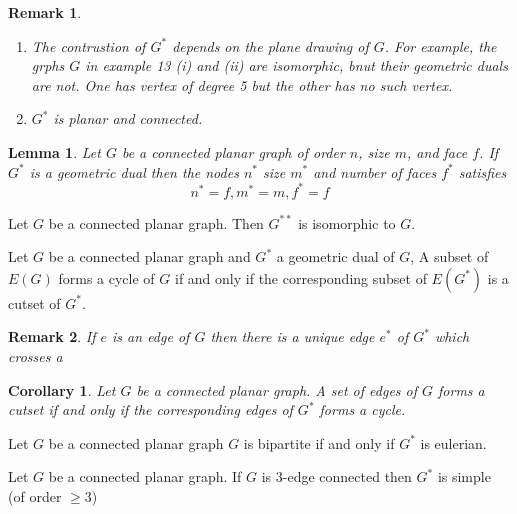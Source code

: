 \documentclass[12pt]{article}
\newenvironment{theorem}[1]{%
  \renewcommand\themanualtheoreminner{#1}%
  \manualtheoreminner
}{\endmanualtheoreminner}
\newtheorem*{corollary}{Corollary}
\newtheorem*{lemma}{Lemma}
\newtheorem*{remark}{Remark}
\begin{document}
\begin{remark}
	\begin{enumerate}
		\item The contrustion of $G^{*}$ depends on the plane drawing of $G$. For example, the grphs $G$ in example 13 (i) and (ii) are isomorphic, bnut their geometric duals are not.  One has vertex of degree 5 but the other has no such vertex.
		\item $G^{*}$ is planar and connected.
	\end{enumerate}
\end{remark}


\begin{lemma}
	Let $G$ be a connected planar graph of order $n$, size $m$, and face $f$. If $G^{*}$ is a geometric dual then the nodes $n^{*}$ size $m^{*}$ and number of faces $f^{*}$ satisfies
	\[n^{*} = f, m^{*} = m, f^{*} =f\]
\end{lemma}


\begin{theorem}{10}
	Let $G$ be a connected planar graph. Then $G^{**}$ is isomorphic to $G$.
\end{theorem}

\begin{theorem}{11}
	Let $G$ be a connected planar graph and $G^{*}$ a geometric dual of $G$, A subset of $E(G)$ forms a cycle of $G$ if and only if the corresponding subset of $E(G^{*})$ is a cutset of $G^{*}$.
\end{theorem}

\begin{remark}
	If $e$ is an edge of $G$ then there is a unique edge $e^{*}$ of $G^{*}$ which crosses a
\end{remark}





\begin{corollary}
	Let $G$ be a connected planar graph. A set of edges of $G$ forms a cutset if and only if the corresponding edges of $G^{*}$ forms a cycle.
\end{corollary}

\begin{theorem}{12}
	Let $G$ be a connected planar graph $G$ is bipartite if and only if $G^{*}$ is eulerian.
\end{theorem}


\begin{theorem}{13}
	Let $G$ be a connected planar graph. If $G$ is 3-edge connected then $G^{*}$ is simple (of order $\ge 3$)
\end{theorem}
\end{document}
